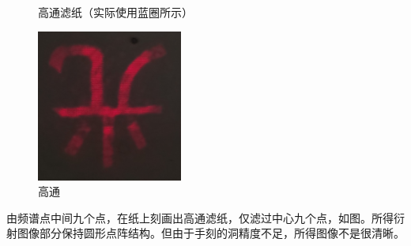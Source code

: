 \documentclass[11pt]{article}
\begin{document}
\begin{enumerate}
\begin{figure}[H]
\begin{minipage}[t]{0.34\linewidth}
            \caption{高通滤纸（实际使用蓝圈所示）}
        \end{minipage}
        \begin{minipage}[t]{0.35\linewidth}
            \centering
            \includegraphics[height=5cm]{Fig/8-高通.jpg}
            \caption{高通}
        \end{minipage}
    \end{figure}
    \par \hspace*{2em} 由频谱点中间九个点，在纸上刻画出高通滤纸，仅滤过中心九个点，如图。所得衍射图像部分保持圆形点阵结构。但由于手刻的洞精度不足，所得图像不是很清晰。
\end{enumerate}
\end{document}
